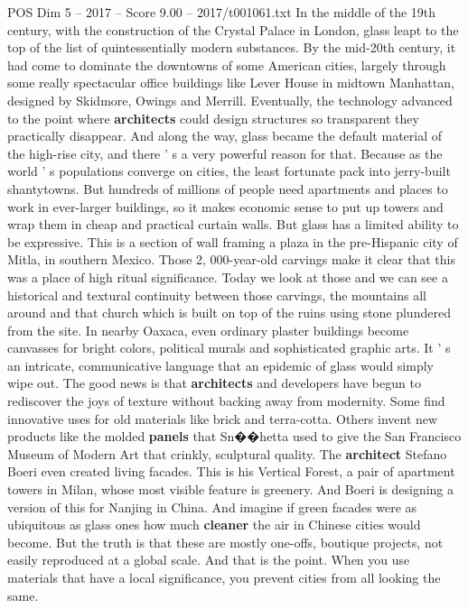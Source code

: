 \begin{textsample}{POS Dim 5 – 2017 – Score 9.00 – 2017/t001061.txt}
In the middle of the 19th century, with the construction of the Crystal Palace in London, glass leapt to the top of the list of quintessentially modern substances.
By the mid-20th century, it had come to dominate the downtowns of some American cities, largely through some really spectacular office buildings like Lever House in midtown Manhattan, designed by Skidmore, Owings and Merrill.
Eventually, the technology advanced to the point where \textbf{architects} could design structures so transparent they practically disappear.
And along the way, glass became the default material of the high-rise city, and there ' s a very powerful reason for that.
Because as the world ' s populations converge on cities, the least fortunate pack into jerry-built shantytowns.
But hundreds of millions of people need apartments and places to work in ever-larger buildings, so it makes economic sense to put up towers and wrap them in cheap and practical curtain walls.
But glass has a limited ability to be expressive.
This is a section of wall framing a plaza in the pre-Hispanic city of Mitla, in southern Mexico.
Those 2, 000-year-old carvings make it clear that this was a place of high ritual significance.
Today we look at those and we can see a historical and textural continuity between those carvings, the mountains all around and that church which is built on top of the ruins using stone plundered from the site.
In nearby Oaxaca, even ordinary plaster buildings become canvasses for bright colors, political murals and sophisticated graphic arts.
It ' s an intricate, communicative language that an epidemic of glass would simply wipe out.
The good news is that \textbf{architects} and developers have begun to rediscover the joys of texture without backing away from modernity.
Some find innovative uses for old materials like brick and terra-cotta.
Others invent new products like the molded \textbf{panels} that Sn{\EmojiFont �}{\EmojiFont �}hetta used to give the San Francisco Museum of Modern Art that crinkly, sculptural quality.
The \textbf{architect} Stefano Boeri even created living facades.
This is his Vertical Forest, a pair of apartment towers in Milan, whose most visible feature is greenery.
And Boeri is designing a version of this for Nanjing in China.
And imagine if green facades were as ubiquitous as glass ones how much \textbf{cleaner} the air in Chinese cities would become.
But the truth is that these are mostly one-offs, boutique projects, not easily reproduced at a global scale.
And that is the point.
When you use materials that have a local significance, you prevent cities from all looking the same.

\end{textsample}
